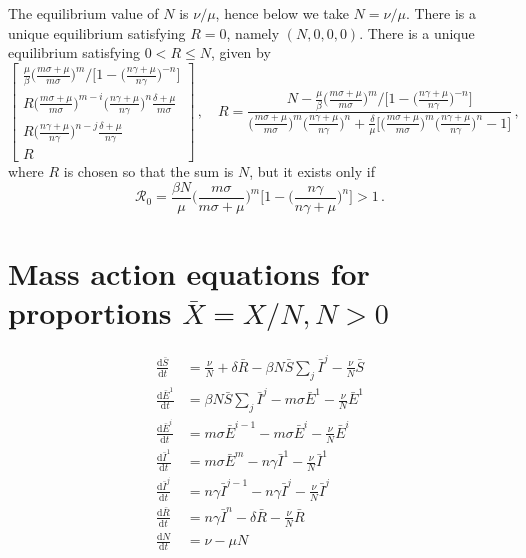 \documentclass[fleqn]{article}
\begin{document}
The equilibrium value of $N$ is $\nu / \mu$, hence below we take
$N = \nu / \mu$.  There is a unique equilibrium satisfying $R = 0$,
namely $(N, 0, 0, 0)$.  There is a unique equilibrium satisfying
$0 < R \leq N$, given by
\begin{equation}
\begin{bmatrix}
  \frac{\mu}{\beta} \big(\frac{m \sigma + \mu}{m \sigma}\big)^{m} \big/ \big[1 - \big(\frac{n \gamma + \mu}{n \gamma}\big)^{-n}\big] \\
  R \big(\frac{m \sigma + \mu}{m \sigma}\big)^{m - i} \big(\frac{n \gamma + \mu}{n \gamma}\big)^{n} \frac{\delta + \mu}{m \sigma} \\
  R \big(\frac{n \gamma + \mu}{n \gamma}\big)^{n - j} \frac{\delta + \mu}{n \gamma} \\
  R
\end{bmatrix}
\,,\quad
R = \frac{N - \frac{\mu}{\beta} \big(\frac{m \sigma + \mu}{m \sigma}\big)^{m} \big/ \big[1 - \big(\frac{n \gamma + \mu}{n \gamma}\big)^{-n}\big]}{\big(\frac{m \sigma + \mu}{m \sigma}\big)^{m} \big(\frac{n \gamma + \mu}{n \gamma}\big)^{n} + \frac{\delta}{\mu} \big[\big(\frac{m \sigma + \mu}{m \sigma}\big)^{m} \big(\frac{n \gamma + \mu}{n \gamma}\big)^{n} - 1\big]}\,,
\end{equation}
where $R$ is chosen so that the sum is $N$, but it exists only if
\begin{equation}
\mathcal{R}_{0} = \frac{\beta N}{\mu} \Big(\frac{m \sigma}{m \sigma + \mu}\Big)^{m} \Big[1 - \Big(\frac{n \gamma}{n \gamma + \mu}\Big)^{n}\Big] > 1\,.
\end{equation}
\clearpage


\section{Mass action equations for proportions $\bar{X} = X/N, N > 0$}

\begin{subequations}
\begin{align}
  \frac{\text{d} \bar{S}    }{\text{d} t}
  &= \frac{\nu}{N} + \delta \bar{R} - \beta N \bar{S} \sum\nolimits_{j} \bar{I}^{j} - \frac{\nu}{N} \bar{S} \\
  \frac{\text{d} \bar{E}^{1}}{\text{d} t}
  &= \beta N \bar{S} \sum\nolimits_{j} \bar{I}^{j} - m \sigma \bar{E}^{1} - \frac{\nu}{N} \bar{E}^{1} \\
  \frac{\text{d} \bar{E}^{i}}{\text{d} t}
  &= m \sigma \bar{E}^{i-1} - m \sigma \bar{E}^{i} - \frac{\nu}{N} \bar{E}^{i} \\
  \frac{\text{d} \bar{I}^{1}}{\text{d} t}
  &= m \sigma \bar{E}^{m} - n \gamma \bar{I}^{1} - \frac{\nu}{N} \bar{I}^{1} \\
  \frac{\text{d} \bar{I}^{j}}{\text{d} t}
  &= n \gamma \bar{I}^{j-1} - n \gamma \bar{I}^{j} - \frac{\nu}{N} \bar{I}^{j} \\
  \frac{\text{d} \bar{R}    }{\text{d} t}
  &= n \gamma \bar{I}^{n} - \delta \bar{R} - \frac{\nu}{N} \bar{R} \\
  \frac{\text{d}      N     }{\text{d} t}
  &= \nu - \mu N
\end{align}
\end{subequations}
\end{document}
